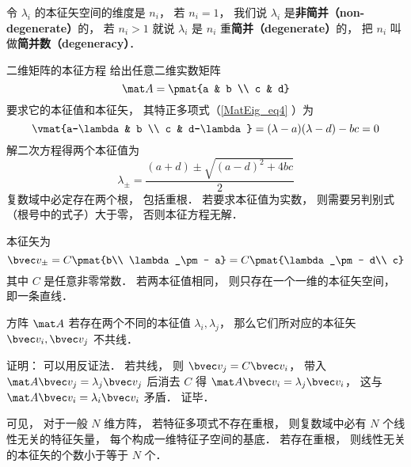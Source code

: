 令 $\lambda_i$ 的本征矢空间的维度是 $n_i$， 若 $n_i = 1$， 我们说 $\lambda_i$ 是\textbf{非简并（non-degenerate）}的， 若 $n_i > 1$ 就说 $\lambda_i$ 是 $n_i$ 重\textbf{简并（degenerate）}的， 把 $n_i$ 叫做\textbf{简并数（degeneracy）}．

\begin{example}{二维矩阵的本征方程}
给出任意二维实数矩阵
\begin{equation}
\mat A = \pmat{a & b \\ c & d}
\end{equation}
要求它的本征值和本征矢， 其特正多项式（\autoref{MatEig_eq4} ）为
\begin{equation}
\vmat{a-\lambda & b \\ c & d-\lambda} = (\lambda-a)(\lambda-d) - bc = 0
\end{equation}
解二次方程得两个本征值为
\begin{equation}
\lambda_\pm = \frac{(a + d) \pm \sqrt{(a-d)^2 + 4bc}}{2}
\end{equation}
复数域中必定存在两个根， 包括重根． 若要求本征值为实数， 则需要另判别式（根号中的式子）大于零， 否则本征方程无解．

本征矢为
\begin{equation}
\bvec v_\pm = C\pmat{b\\ \lambda_\pm - a} = C\pmat{\lambda_\pm - d\\ c}
\end{equation}
其中 $C$ 是任意非零常数． 若两本征值相同， 则只存在一个一维的本征矢空间， 即一条直线．
\end{example}

\begin{theorem}{}
方阵 $\mat A$ 若存在两个不同的本征值 $\lambda_i, \lambda_j$， 那么它们所对应的本征矢 $\bvec v_i, \bvec v_j$ 不共线．
\end{theorem}
证明： 可以用反证法． 若共线， 则 $\bvec v_j = C \bvec v_i$， 带入 $\mat A \bvec v_j = \lambda_j \bvec v_j$ 后消去 $C$ 得 $\mat A \bvec v_i = \lambda_j \bvec v_i$， 这与 $\mat A \bvec v_i = \lambda_i \bvec v_i$ 矛盾． 证毕．

可见， 对于一般 $N$ 维方阵， 若特征多项式不存在重根， 则复数域中必有 $N$ 个线性无关的特征矢量， 每个构成一维特征子空间的基底． 若存在重根， 则线性无关的本征矢的个数小于等于 $N$ 个．


